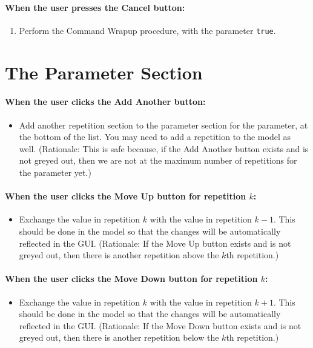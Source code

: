 \documentclass[11pt]{article}
\begin{document}
\paragraph{When the user presses the Cancel button:}
\begin{enumerate}
\item Perform the Command Wrapup procedure, with the parameter {\tt true}.
\end{enumerate}

\section{The Parameter Section}

\paragraph{When the user clicks the Add Another button:}
\begin{itemize}
\item Add another repetition section to the parameter section for the
  parameter, at the bottom of the list.  You may need to add a repetition
  to the model as well.
  (Rationale:  This is safe because, if the Add Another button exists
  and is not greyed out, then we are not at the maximum number of
  repetitions for the parameter yet.)
\end{itemize}

\paragraph{When the user clicks the Move Up button for repetition $k$:}
\begin{itemize}
\item Exchange the value in repetition $k$ with the value in repetition $k-1$.
  This should be done in the model so that the changes will be automatically
  reflected in the GUI.
  (Rationale:  If the Move Up button exists and is not greyed out, then
  there is another repetition above the $k$th repetition.)
\end{itemize}

\paragraph{When the user clicks the Move Down button for repetition $k$:}
\begin{itemize}
\item Exchange the value in repetition $k$ with the value in repetition $k+1$.
  This should be done in the model so that the changes will be automatically
  reflected in the GUI.
  (Rationale:  If the Move Down button exists and is not greyed out, then
  there is another repetition below the $k$th repetition.)
\end{itemize}
\end{document}
